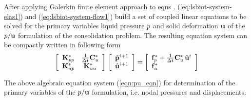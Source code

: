 After applying Galerkin finite element approach to eqns . (\ref{eq:lsbiot-system-elas1}) and (\ref{eq:lsbiot-system-flow1}) build a set of
coupled linear equations to be solved for the primary variables
liquid pressure $p$ and solid deformation $\mathbf u$ of the
$p / \mathbf u$ formulation of the consolidation problem. The
resulting equation system can be compactly written in following
form
\begin{equation}
\left[%
\begin{array}{cc}
\bK_{pp}^* & \frac{1}{\Delta t}\bC_{u}^*
\\
\bK_{up}^* & \bK_{uu}^*
\end{array}%
\right]
\,
\left[%
\begin{array}{c}
\hat{\bp}^{i+1}
\\
\hat{\bu}^{i+1}
\end{array}%
\right]
=
\left[%
\begin{array}{l}
\mathbf{f}_{p}^* + \frac{1}{\Delta t}\bC_{u}^* \, \hat\bu^i
\\
\mathbf{f}_{u}^*
\end{array}%
\right]
\label{eqn:pu_eqn}
\end{equation}

The above algebraic equation system (\ref{eqn:pu_eqn}) for
determination of the primary variables of the $p/\mathbf u$
formulation, i.e. nodal pressures and displacements.
